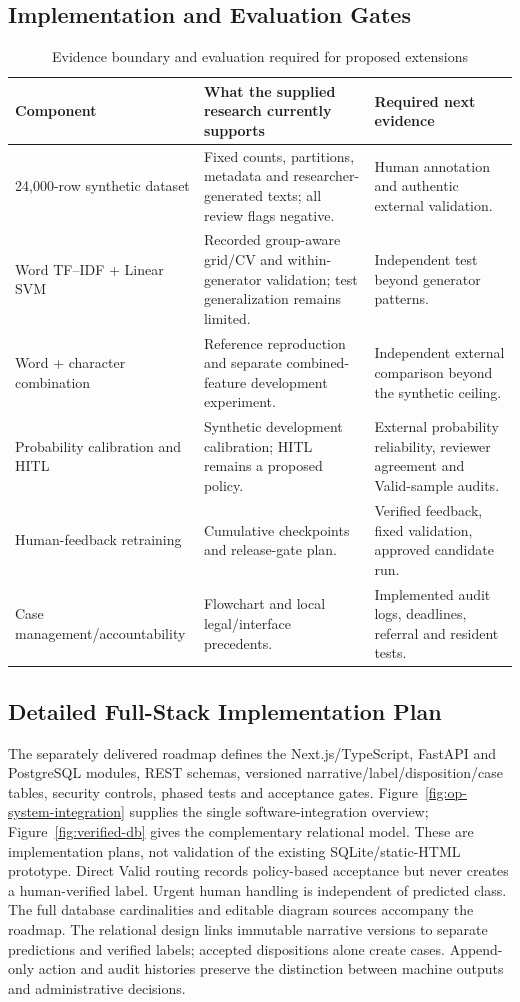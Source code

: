 \subsection{Implementation and Evaluation Gates}
\begin{table}[H]\centering\small\caption{Evidence boundary and evaluation required for proposed extensions}\label{tab:op-evidence}\begin{tabularx}{\textwidth}{p{}Xp{}}\toprule
Component & What the supplied research currently supports & Required next evidence\\\midrule
24,000-row synthetic dataset & Fixed counts, partitions, metadata and researcher-generated texts; all review flags negative. & Human annotation and authentic external validation.\\
Word TF--IDF + Linear SVM & Recorded group-aware grid/CV and within-generator validation; test generalization remains limited. & Independent test beyond generator patterns.\\
Word + character combination & Reference reproduction and separate combined-feature development experiment. & Independent external comparison beyond the synthetic ceiling.\\
Probability calibration and HITL & Synthetic development calibration; HITL remains a proposed policy. & External probability reliability, reviewer agreement and Valid-sample audits.\\
Human-feedback retraining & Cumulative checkpoints and release-gate plan. & Verified feedback, fixed validation, approved candidate run.\\
Case management/accountability & Flowchart and local legal/interface precedents. & Implemented audit logs, deadlines, referral and resident tests.\\\bottomrule
\end{tabularx}\end{table}

\subsection{Detailed Full-Stack Implementation Plan}
The separately delivered roadmap defines the Next.js/TypeScript, FastAPI and PostgreSQL modules, REST schemas, versioned narrative/label/disposition/case tables, security controls, phased tests and acceptance gates. Figure~\ref{fig:op-system-integration} supplies the single software-integration overview; Figure~\ref{fig:verified-db} gives the complementary relational model. These are implementation plans, not validation of the existing SQLite/static-HTML prototype. Direct Valid routing records policy-based acceptance but never creates a human-verified label. Urgent human handling is independent of predicted class. The full database cardinalities and editable diagram sources accompany the roadmap.
The relational design links immutable narrative versions to separate predictions and verified labels; accepted dispositions alone create cases. Append-only action and audit histories preserve the distinction between machine outputs and administrative decisions.


